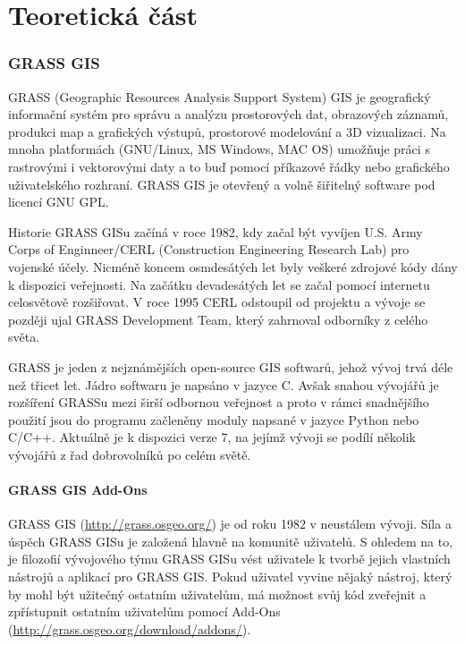 \documentclass[12pt,a4paper]{article}
\begin{document}
\newpage
\part{Teoretická část}

\newpage
\section{GRASS GIS}

GRASS (Geographic Resources Analysis Support System)
GIS je geografický informační systém
pro správu a analýzu prostorových dat, obrazových záznamů, produkci
map a grafických výstupů, prostorové modelování a 3D vizualizaci. Na
mnoha platformách (GNU/Linux, MS Windows, MAC OS) umožňuje práci s
rastrovými i vektorovými daty a to buď pomocí příkazové řádky nebo
grafického uživatelského rozhraní. GRASS GIS je otevřený a volně
šiřitelný software pod licencí GNU GPL.

Historie\cite{rukovet} GRASS GISu začíná v roce 1982, kdy začal být
vyvíjen U.S. Army Corps of Enginneer/CERL (Construction Engineering
Research Lab) pro vojenské účely. Nicméně koncem osmdesátých let byly
veškeré zdrojové kódy dány k dispozici veřejnosti. Na začátku
devadesátých let se začal pomocí internetu celosvětově rozšiřovat. V
roce 1995 CERL odstoupil od projektu a vývoje se později ujal GRASS
Development Team, který zahrnoval odborníky z celého světa.

GRASS je jeden z nejznámějších open-source GIS softwarů, jehož vývoj
trvá déle než třicet let. Jádro softwaru je napsáno v jazyce C. Avšak
snahou vývojářů je rozšíření GRASSu mezi širší odbornou veřejnost a
proto v rámci snadnějšího použití jsou do programu začleněny moduly
napsané v jazyce Python nebo C/C++. Aktuálně je k dispozici verze 7, na
jejímž vývoji se podílí několik vývojářů z řad dobrovolníků po celém
světě.

\subsection{GRASS GIS Add-Ons}

GRASS GIS (\url{http://grass.osgeo.org/}) je od roku 1982 v neustálem vývoji. Síla a úspěch GRASS GISu
je založená hlavně na komunitě uživatelů. S ohledem na to, je
filozofií vývojového týmu GRASS GISu vést uživatele k tvorbě jejich
vlastních nástrojů a aplikací pro GRASS GIS. Pokud uživatel vyvine
nějaký nástroj, který by mohl být užitečný ostatním uživatelům, má
možnost svůj kód zveřejnit a zpřístupnit ostatním uživatelům pomocí
Add-Ons (\url{http://grass.osgeo.org/download/addons/}).
\end{document}
